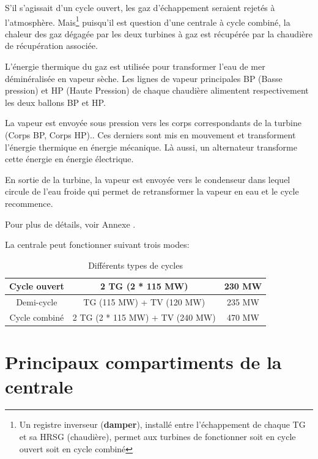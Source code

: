 S'il s'agissait d'un cycle ouvert, les gaz d'échappement seraient rejetés à l'atmosphère.
Mais\footnote{Un registre inverseur (\textbf{damper}), installé entre l'échappement de chaque TG et sa HRSG (chaudière), permet aux turbines de fonctionner soit en cycle ouvert soit en cycle combiné} puisqu'il est question d'une centrale à cycle combiné, la chaleur des gaz dégagée par les deux turbines à gaz est récupérée par la chaudière de récupération associée.

L'énergie thermique du gaz est utilisée pour transformer l'eau de mer déminéralisée en vapeur sèche.
Les lignes de vapeur principales BP (Basse pression) et HP (Haute Pression) de chaque chaudière alimentent respectivement les deux ballons BP et HP.

La vapeur est envoyée sous pression vers les corps correspondants de la turbine (Corps BP, Corps HP).. Ces derniers sont  mis en mouvement et transforment l'énergie thermique en énergie mécanique. Là aussi, un alternateur transforme cette énergie en énergie électrique.

En sortie de la turbine, la vapeur est envoyée vers le condenseur dans lequel circule de l'eau froide qui permet de retransformer la vapeur en eau et le cycle recommence.

Pour plus de détails, voir Annexe \uppercase\expandafter{}.

La centrale peut fonctionner suivant trois modes: 
\begin{table}[h]

\centering
\begin{tabular}{|c|c|c|}
\hline
Cycle ouvert  & 2 TG (2 * 115 MW) &  230 MW\\
\hline
Demi-cycle  & TG (115 MW)  + TV (120 MW)  & 235 MW \\
\hline
Cycle combiné  & 2 TG (2 * 115 MW) + TV (240 MW)   & 470 MW \\
\hline
\end{tabular}
\caption{Différents types de cycles}
\end{table}



\section{Principaux compartiments de la centrale }
